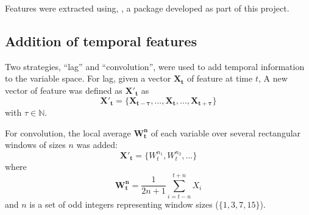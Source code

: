 

Features were extracted using, \pr{}, a \py{} package developed as part of this project.


\subsection{Addition of temporal features}
Two strategies, ``lag'' and ``convolution'', were used to add temporal information to the variable space.
For lag, given a vector $\mathbf{X_t}$ of feature at time $t$,
A new vector of feature was defined as $\mathbf{{X'}_t}$ as
\begin{equation}
\mathbf{{X'}_t} = \{\mathbf{X_{t-\tau}}, ..., \mathbf{X_t}, ..., \mathbf{X_{t+\tau}}\}
\label{eq:tau}
\end{equation}
with $\tau \in \mathbb{N}$.

For convolution, the local average $\mathbf{W^n_t}$ of each variable over several rectangular windows of sizes $n$ was added:
\begin{equation}
\mathbf{{X'}_t} = \{W^{n_1}_t, W^{n_2}_t, ...\}
\label{eq:window}
\end{equation}
where
\[
\mathbf{W^n_t} = \frac{1}{2n+1} \sum_{i = t-n}^{t+n}{X_i}
\]
and $n$ is a set of odd integers representing window sizes (\eg $\{1,3,7,15\}$).



